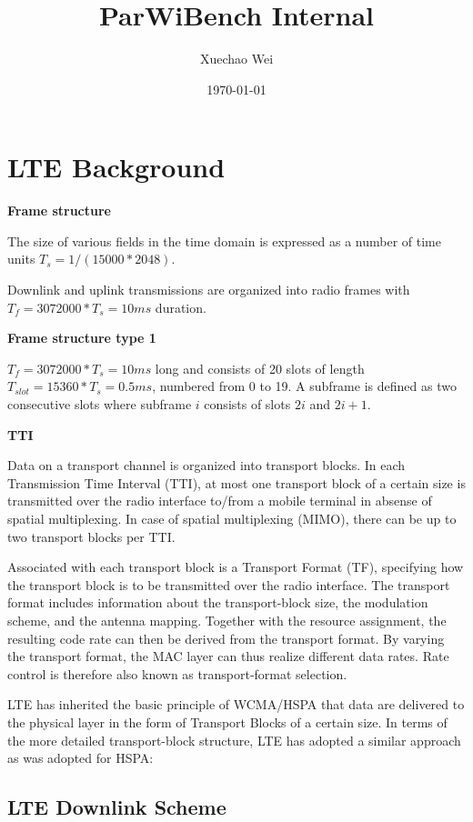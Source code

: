 \documentclass[titlepage]{article}
\numberwithin{figure}{section}
\numberwithin{equation}{section}
\begin{document}
\title{ParWiBench Internal}
\author{Xuechao Wei}
\date{\today}
\maketitle



\section{LTE Background}

\textbf{Frame structure}\cite{erik}

The size of various fields in the time domain is expressed as a number of time units $T_{s}=1/(15000*2048)$.

Downlink and uplink transmissions are organized into radio frames with $T_{f}=3072000*T_{s}=10ms$ duration.

\textbf{Frame structure type 1}

$T_{f}=3072000*T_{s}=10ms$ long and consists of 20 slots of length $T_{slot}=15360*T_{s}=0.5ms$, numbered from 0 to 19. A subframe is defined as two consecutive slots where subframe $i$ consists of slots $2i$ and $2i+1$.

\textbf{TTI}

Data on a transport channel is organized into transport blocks. In each Transmission Time Interval (TTI), at most one transport block of a certain size is transmitted over the radio interface to/from a mobile terminal in absense of spatial multiplexing. In case of spatial multiplexing (MIMO), there can be up to two transport blocks per TTI.

Associated with each transport block is a Transport Format (TF), specifying how the transport block is to be transmitted over the radio interface. The transport format includes information about the transport-block size, the modulation scheme, and the antenna mapping. Together with the resource assignment, the resulting code rate can then be derived from the transport format. By varying the transport format, the MAC layer can thus realize different data rates. Rate control is therefore also known as transport-format selection.

LTE has inherited the basic principle of WCMA/HSPA that data are delivered to the physical layer in the form of Transport Blocks of a certain size. In terms of the more detailed transport-block structure, LTE has adopted a similar approach as was adopted for HSPA:

\subsection{LTE Downlink Scheme}
\end{document}
